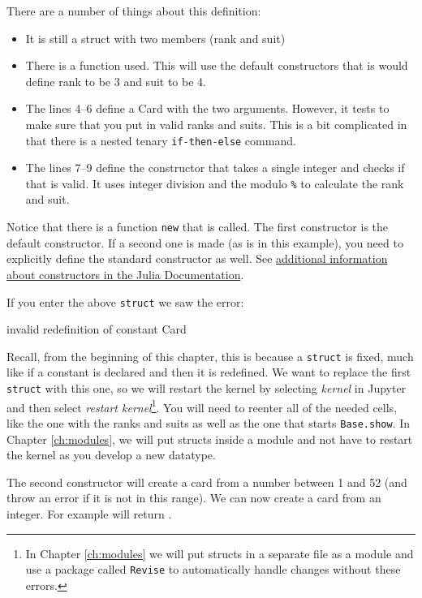 There are a number of things about this definition:
\begin{itemize}
\item It is still a struct with two members (rank and suit)
\item There is a function  used.  This will use the default constructors that is  would define rank to be 3 and suit to be 4. 
\item The lines 4--6 define a Card with the two arguments.  However, it tests to make sure that you put in valid ranks and suits.  This is a bit complicated in that there is a nested tenary \verb!if-then-else! command. 
\item The lines 7--9 define the constructor that takes a single integer and checks if that is valid. It uses integer division and the modulo \verb!%! to calculate the rank and suit.  
\end{itemize}


Notice that there is a function \texttt{new} that is called. The first
constructor is the default constructor. If a second one is made (as is
in this example), you need to explicitly define the standard constructor as well. See
\href{https://docs.julialang.org/en/latest/manual/constructors/\#man-constructors-1}{additional
information about constructors in the Julia Documentation}.

If you enter the above \texttt{struct} we saw the error:
\begin{jlverbatim}
invalid redefinition of constant Card
\end{jlverbatim}
Recall, from the beginning of this chapter, this is because a \texttt{struct} is fixed, much like if a constant is declared and then it is redefined.  We want to replace the first \texttt{struct} with this one, so we will restart the kernel by selecting \emph{kernel} in Jupyter and then select \emph{restart kernel}\footnote{In Chapter \ref{ch:modules} we will put structs in a separate file as a module and use a package called \texttt{Revise} to automatically handle changes without these errors.}.  You will need to reenter all of the needed cells, like the one with the ranks and suits as well as the one that starts \texttt{Base.show}.  In Chapter \ref{ch:modules}, we will put structs inside a module and not have to restart the kernel as you develop a new datatype.   

The second constructor will create a card from a number between 1 and 52 (and throw an error if it is not in this range). We can now create a card from an integer. For example  will return   \printpythontex[verb]. 


